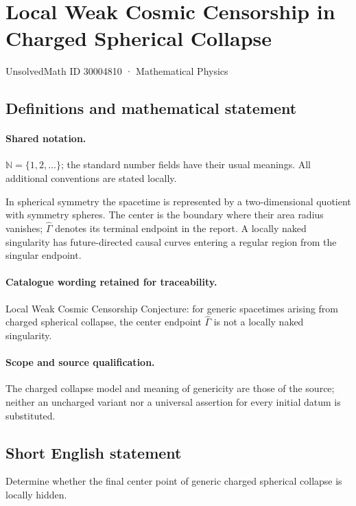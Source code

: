 \documentclass[11pt]{article}
\begin{document}
\setcounter{section}{30004809}
\section{Local Weak Cosmic Censorship in Charged Spherical Collapse}\label{30004810}
{\small UnsolvedMath ID 30004810 · Mathematical Physics}
\subsection{Definitions and mathematical statement}

\paragraph{Shared notation.}$\mathbb N=\{1,2,\ldots\}$; the standard number fields have their usual meanings. All additional conventions are stated locally.


In spherical symmetry the spacetime is represented by a two-dimensional quotient with symmetry spheres. The center is the boundary where their area radius vanishes; $\widehat\Gamma$ denotes its terminal endpoint in the report. A locally naked singularity has future-directed causal curves entering a regular region from the singular endpoint.

\paragraph{Catalogue wording retained for traceability.}
Local Weak Cosmic Censorship Conjecture: for generic spacetimes arising from charged spherical collapse, the center endpoint $\widehat{\Gamma}$ is not a locally naked singularity.

\paragraph{Scope and source qualification.}The charged collapse model and meaning of genericity are those of the source; neither an uncharged variant nor a universal assertion for every initial datum is substituted.
\subsection{Short English statement}
Determine whether the final center point of generic charged spherical collapse is locally hidden.
\end{document}
